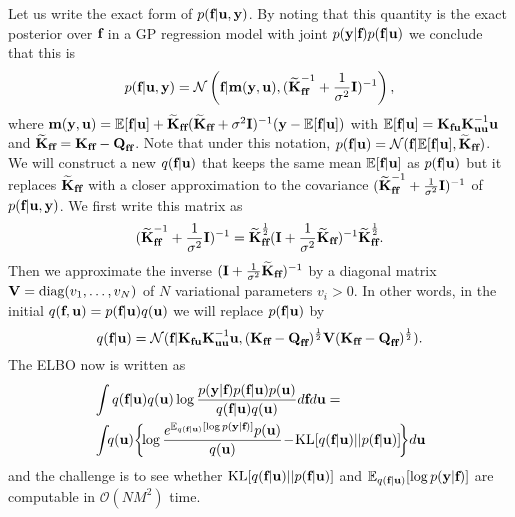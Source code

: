 Let us write the 
exact form of $p(\textbf{f} | \textbf{u}, \textbf{y})$. By noting that this quantity is the exact posterior over $\textbf{f}$ in a GP regression model with joint $p(\textbf{y} | \textbf{f}) p(\textbf{f} | \textbf{u})$ 
we conclude that this %
is 
$$
p(\textbf{f} | \textbf{u}, \textbf{y}) = \mathcal{N}\left(\textbf{f}| \textbf{m}(\textbf{y},\textbf{u}), 
(\widetilde{\textbf{K}}_{\textbf{f} \textbf{f}}^{-1} + \frac{1}{\sigma^2} \textbf{I})^{-1} \right),
$$
where $\textbf{m}(\textbf{y},\textbf{u})  = \mathbb{E}[\textbf{f} | \textbf{u}] + \widetilde{\textbf{K}}_{\textbf{f} \textbf{f}} (\widetilde{\textbf{K}}_{\textbf{f} \textbf{f}} + \sigma^2 \textbf{I})^{-1} (\textbf{y} - \mathbb{E}[\textbf{f} | \textbf{u}]) $
with $\mathbb{E}[\textbf{f} | \textbf{u}] = \textbf{K}_{\textbf{f} \textbf{u}} \textbf{K}_{\textbf{u} \textbf{u}}^{-1} \textbf{u}$ and $\widetilde{\textbf{K}}_{\textbf{f} \textbf{f}} = \textbf{K}_{\textbf{f} \textbf{f}} - \textbf{Q}_{\textbf{f} \textbf{f}}$. Note that under this notation, 
$p(\textbf{f} | \textbf{u}) = \mathcal{N}(\textbf{f} | \mathbb{E}[\textbf{f} | \textbf{u}], \widetilde{\textbf{K}}_{\textbf{f} \textbf{f}})$. We will construct a new $q(\textbf{f} | \textbf{u})$ 
that keeps the same mean $\mathbb{E}[\textbf{f} | \textbf{u}]$ 
as $p(\textbf{f} | \textbf{u})$ but it replaces $\widetilde{\textbf{K}}_{\textbf{f} \textbf{f}}$ with a closer approximation to the 
covariance 
$(\widetilde{\textbf{K}}_{\textbf{f} \textbf{f}}^{-1} + \frac{1}{\sigma^2} \textbf{I})^{-1}$ of $p(\textbf{f} | \textbf{u}, \textbf{y})$. We first 
write this %
matrix as 
\begin{equation}
(\widetilde{\textbf{K}}_{\textbf{f} \textbf{f}}^{-1} + \frac{1}{\sigma^2} \textbf{I})^{-1}
= \widetilde{\textbf{K}}_{\textbf{f} \textbf{f}}^{\frac{1}{2}}
( \textbf{I} + \frac{1}{\sigma^2} \widetilde{\textbf{K}}_{\textbf{f} \textbf{f}})^{-1} 
\widetilde{\textbf{K}}_{\textbf{f} \textbf{f}}^{\frac{1}{2}}.
\label{eq:exact_cov_pfuy}
\end{equation}
Then we approximate the inverse 
$( \textbf{I} + \frac{1}{\sigma^2} \widetilde{\textbf{K}}_{\textbf{f} \textbf{f}})^{-1}$ by a diagonal matrix $\textbf{V} = \text{diag}(v_1, \ldots,v_N)$ of $N$ variational parameters $v_i > 0$. In other words,  in the initial $q(\textbf{f}, \textbf{u}) = p(\textbf{f}|\textbf{u})q(\textbf{u})$ we will replace $p(\textbf{f}|\textbf{u})$ by 
\begin{equation}
q(\textbf{f}|\textbf{u}) = \mathcal{N}(\textbf{f} | \textbf{K}_{\textbf{f} \textbf{u}} \textbf{K}_{\textbf{u} \textbf{u}}^{-1} \textbf{u}, (\textbf{K}_{\textbf{f} \textbf{f}} - \textbf{Q}_{\textbf{f} \textbf{f}})^{\frac{1}{2}} \textbf{V}
(\textbf{K}_{\textbf{f} \textbf{f}} - \textbf{Q}_{\textbf{f} \textbf{f}})^{\frac{1}{2}}).
\label{eq:qfu}
\end{equation}
The ELBO now is written as 
\begin{align} 
 & \int q(\f | \bu) q(\bu) \log \frac{p(\y | \f) p(\f | \bu) p(\bu)}{q(\f | \bu) q(\bu)} d \f d \bu = \nonumber \\ 
& \int \! \!  q(\bu) \! \left\{ \! \log \frac{e^{\E_{q(\f | \bu)}[\log p(\y | \f)]} p(\bu)}{q(\bu)} \! - \! \text{KL}[q(\f | \bu) || p(\f | \bu)] 
\! \right\} \! d \bu \nonumber 
\end{align}
and the challenge is to see whether 
$\text{KL}[q(\textbf{f} | \textbf{u}) || p(\textbf{f} | \textbf{u})]$ 
and $\mathbb{E}_{q(\textbf{f} | \textbf{u})}[\log p(\textbf{y} | \textbf{f})]$ 
are computable in $\mathcal{O}(N M^2)$ time. 
